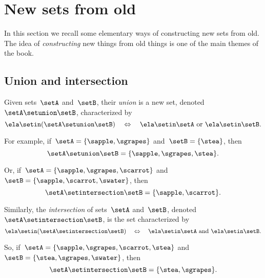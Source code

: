 
\section{New sets from old}

In this section we recall some elementary ways of constructing new sets from old.
% 
The idea of \emph{constructing} new things from old things is one of the main themes of the book.

\subsection{Union and intersection}

Given sets~$\setA$ and~$\setB$, their \emph{union} is a new set, denoted~$\setA \setunion \setB$, characterized by
\begin{equation*}
    \ela \setin(\setA \setunion \setB) \quad \Leftrightarrow \quad \ela \setin\setA \ \text{or} \ \ela \setin\setB.
\end{equation*}

For example, if~$\setA = \{ \sapple, \sgrapes \}$ and~$\setB = \{ \stea \}$, then
\begin{equation*}
    \setA \setunion \setB = \{ \sapple, \sgrapes, \stea \}.
\end{equation*}

Or, if~$\setA = \{ \sapple, \sgrapes, \scarrot \}$ and~$\setB = \{ \sapple, \scarrot, \swater \}$, then
\begin{equation*}
    \setA \setintersection \setB = \{ \sapple, \scarrot \}.
\end{equation*}

Similarly, the \emph{intersection} of sets~$\setA$ and~$\setB$, denoted~$\setA \setintersection \setB$, is the set characterized by
\begin{equation*}
    \ela \setin(\setA \setintersection \setB) \quad \Leftrightarrow \quad \ela \setin\setA \ \text{and} \ \ela \setin\setB.
\end{equation*}

So, if~$\setA = \{ \sapple, \sgrapes, \scarrot, \stea \}$ and~$\setB = \{ \stea, \sgrapes, \swater \}$, then
\begin{equation*}
    \setA \setintersection \setB = \{ \stea, \sgrapes \}.
\end{equation*}



